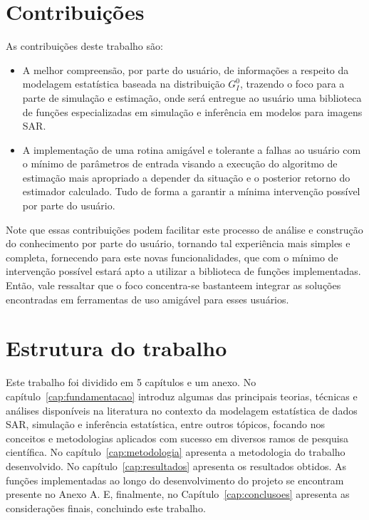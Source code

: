 \section{Contribuições}

As contribuições deste trabalho são:

\begin{itemize}
\item A melhor compreensão, por parte do usuário, de informações a respeito da modelagem estatística baseada na distribuição $G_I^0$, trazendo o foco para a parte de simulação e estimação, onde será entregue ao usuário uma biblioteca de funções especializadas em simulação e inferência em modelos para imagens SAR. 
\item A implementação de uma rotina amigável e tolerante a falhas ao usuário com o mínimo de parâmetros de entrada visando a execução do algoritmo de estimação mais apropriado a depender da situação e o posterior retorno do estimador calculado. Tudo de forma a garantir a mínima intervenção possível por parte do usuário.
\end{itemize}

Note que essas contribuições podem facilitar este processo de análise e construção do conhecimento por parte do usuário, tornando tal experiência mais simples e completa, fornecendo para este novas funcionalidades, que com o mínimo de intervenção possível estará apto a utilizar a biblioteca de funções implementadas. Então, vale ressaltar que o foco concentra-se bastanteem integrar as soluções encontradas em ferramentas de uso amigável para esses usuários.

\section{Estrutura do trabalho}

Este trabalho foi dividido em 5 capítulos e um anexo. 
No capítulo~\ref{cap:fundamentacao} introduz algumas das principais teorias, técnicas e análises disponíveis na literatura no contexto da modelagem estatística de dados SAR, simulação e inferência estatística, entre outros tópicos, focando nos conceitos e metodologias aplicados com sucesso em diversos ramos de pesquisa científica.
No capítulo~\ref{cap:metodologia} apresenta a metodologia do trabalho desenvolvido.
No capítulo~\ref{cap:resultados} apresenta os resultados obtidos.
As funções implementadas ao longo do desenvolvimento do projeto se encontram presente no Anexo A.
E, finalmente, no Capítulo~\ref{cap:conclusoes} apresenta as considerações finais, concluindo este trabalho.

\newpage\lhead{\rightmark}

